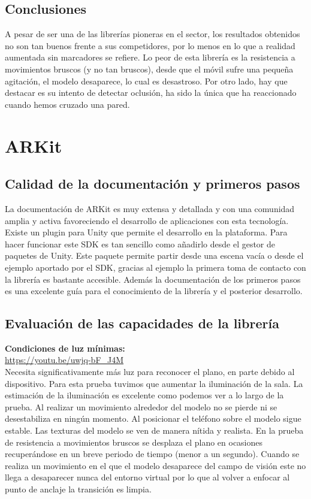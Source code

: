\subsection{Conclusiones}
A pesar de ser una de las librerías pioneras en el sector, los resultados obtenidos no son tan buenos frente a sus competidores, por lo menos en lo que a realidad aumentada sin marcadores se refiere. Lo peor de esta librería es la resistencia a movimientos bruscos (y no tan bruscos), desde que el móvil sufre una pequeña agitación, el modelo desaparece, lo cual es desastroso. Por otro lado, hay que destacar es su intento de detectar oclusión, ha sido la única que ha reaccionado cuando hemos cruzado una pared.

\section{ARKit}
\subsection{Calidad de la documentación y primeros pasos}
La documentación de ARKit es muy extensa y detallada y con una comunidad amplia y activa favoreciendo el desarrollo de aplicaciones con esta tecnología. Existe un plugin para Unity que permite el desarrollo en la plataforma.  Para hacer funcionar este SDK es tan sencillo como añadirlo desde el gestor de paquetes de Unity. Este paquete permite partir desde una escena vacía o desde el ejemplo aportado por el SDK, gracias al ejemplo la primera toma de contacto con la librería es bastante accesible. Además la documentación de los primeros pasos es una excelente guía para el conocimiento de la librería y el posterior desarrollo.

\subsection{Evaluación de las capacidades de la librería}

\textbf{Condiciones de luz mínimas:}\\ 
\url{https://youtu.be/uwjq-bF_J4M}\\

Necesita significativamente más luz para reconocer el plano, en parte debido al dispositivo. Para esta prueba tuvimos que aumentar la iluminación de la sala. La estimación de la iluminación es excelente como podemos ver a lo largo de la prueba. Al realizar un movimiento alrededor del modelo no se pierde ni se desestabiliza en ningún momento. Al posicionar el teléfono sobre el modelo sigue estable. Las texturas del modelo se ven de manera nítida y realista. En la prueba de resistencia a movimientos bruscos se desplaza el plano en ocasiones recuperándose en un breve periodo de tiempo (menor a un segundo). Cuando se realiza un movimiento en el que el modelo desaparece del campo de visión este no llega a desaparecer nunca del entorno virtual por lo que al volver a enfocar al punto de anclaje la transición es limpia.\\

